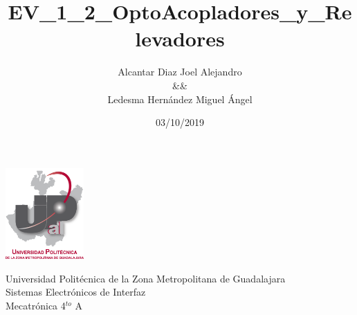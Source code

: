 \documentclass[letterpaper]{article}
\title{EV\_1\_2\_OptoAcopladores\_y\_Relevadores}
\author{Alcantar Diaz Joel Alejandro \\\&\&\\ Ledesma Hernández Miguel Ángel}
\date{03/10/2019}
\begin{document}
\maketitle

\vspace{1cm}
\begin{center}
\includegraphics[width=3cm]{IMG/UPZMGlog.png}\\
\vspace{5cm}
\begin{large}
Universidad Politécnica de la Zona Metropolitana de Guadalajara\\

\vspace{1.5cm}
Sistemas Electrónicos de Interfaz\\
Mecatrónica 4$^{to}$ A
\end{large}
\end{center}
\end{document}
